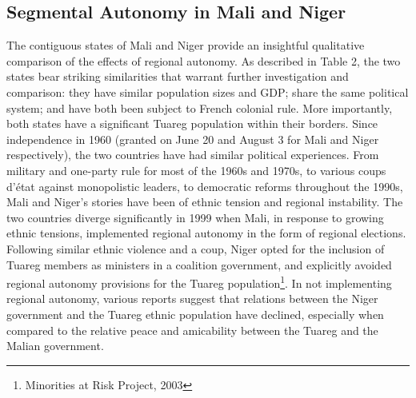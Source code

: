 \documentclass[12pt]{article}
\begin{document}
\subsection{Segmental Autonomy in Mali and Niger}
The contiguous states of Mali and Niger provide an insightful qualitative comparison of the effects of regional autonomy. As described in Table 2, the two states bear striking similarities that warrant further investigation and comparison: they have similar population sizes and GDP; share the same political system; and have both been subject to French colonial rule. More importantly, both states have a significant Tuareg population within their borders. Since independence in 1960 (granted on  June 20 and August 3 for Mali and Niger respectively), the two countries have had similar political experiences. From military and one-party rule for most of the 1960s and 1970s, to various coups d’état against monopolistic leaders, to democratic reforms throughout the 1990s, Mali and Niger's stories have been of ethnic tension and regional instability. The two countries diverge significantly in 1999 when Mali, in response to growing ethnic tensions, implemented regional autonomy in the form of regional elections. Following similar ethnic violence and a coup, Niger opted for the inclusion of Tuareg members as ministers in a coalition government, and explicitly avoided regional autonomy provisions for the Tuareg population\footnote{Minorities at Risk Project, 2003}. In not implementing regional autonomy, various reports suggest that relations between the Niger government and the Tuareg ethnic population have declined, especially when compared to the relative peace and amicability between the Tuareg and the Malian government. 

\begin{table}[ht]
\centering
\setlength{\tabcolsep}{10pt}
\renewcommand{\arraystretch}{1.5} 
\caption{Country Characteristics Around Mali's Decentralization}
\end{table}
\end{document}

